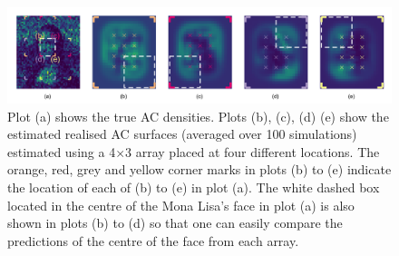 \documentclass[10pt,a4paper]{article}
\begin{document}

\begin{figure}[htbp]
\centering
\includegraphics[width=1\textwidth]{mona_torch_higheffort.png}
\caption{Plot (a) shows the true AC densities. Plots (b), (c), (d) (e) show the estimated realised AC surfaces (averaged over 100 simulations) estimated using a 4$\times$3 array placed at four different locations. The orange, red, grey and yellow corner marks in plots (b) to (e) indicate the location of each of (b) to (e) in plot (a). The white dashed box located in the centre of the Mona Lisa's face in plot (a) is also shown in plots (b) to (d) so that one can easily compare the predictions of the centre of the face from each array.}
\label{mona_torch_higheffort}
\end{figure}

\end{document}
